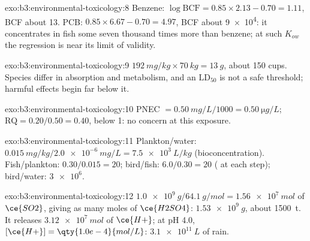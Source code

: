 \begin{solution}{exo:b3:environmental-toxicology:8}
Benzene: $\log\mathrm{BCF} = 0.85 \times 2.13 - 0.70 = 1.11$, BCF about 13. PCB: $0.85 \times 6.67 - 0.70 = 4.97$, BCF about
\num{9e4}: it concentrates in fish some seven thousand times more than benzene; at such
$K_{ow}$ the regression is near its limit of validity.
\end{solution}

\begin{solution}{exo:b3:environmental-toxicology:9}
$\qty{192}{mg/kg} \times \qty{70}{kg} = \qty{13}{g}$, about 150 cups. Species differ in absorption and metabolism,
and an $\mathrm{LD_{50}}$ is not a safe threshold; harmful effects begin far below it.
\end{solution}

\begin{solution}{exo:b3:environmental-toxicology:10}
PNEC $= \qty{0.50}{mg/L}/1000 = \qty{0.50}{\micro g/L}$; $\mathrm{RQ} = 0.20/0.50 = 0.40$, below 1: no concern at this exposure.
\end{solution}

\begin{solution}{exo:b3:environmental-toxicology:11}
Plankton/water: $\qty{0.015}{mg/kg}/\qty{2.0e-6}{mg/L} = \qty{7.5e3}{L/kg}$ (bioconcentration). Fish/plankton: $0.30/0.015 = 20$;
bird/fish: $6.0/0.30 = 20$ ( at each step); bird/water: $\num{3e6}$.
\end{solution}

\begin{solution}{exo:b3:environmental-toxicology:12}
$\qty{1.0e9}{g}/\qty{64.1}{g/mol} = \qty{1.56e7}{mol}$ of $\ce{SO2}$, giving as many moles of $\ce{H2SO4}$: $\qty{1.53e9}{g}$, about \qty{1500}{t}. It
releases $\qty{3.12e7}{mol}$ of $\ce{H+}$; at pH 4.0, $[\ce{H+}] = \qty{1.0e-4}{mol/L}$: $\qty{3.1e11}{L}$ of rain.
\end{solution}

